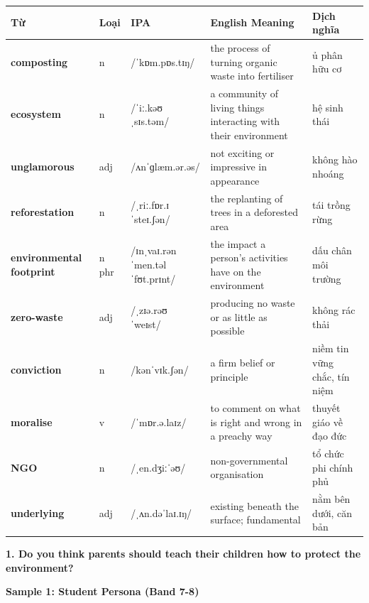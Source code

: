 \vspace{0.8em}
\begin{center}
\renewcommand{\arraystretch}{1.65}
\begin{tabularx}{\textwidth}{|V{0.22\textwidth}|C{0.07\textwidth}|I{0.20\textwidth}|Y|V{0.18\textwidth}|}
\hline
{}
\textbf{Từ} & \textbf{Loại} & \textbf{IPA} & \textbf{English Meaning} & \textbf{Dịch nghĩa} \\
\hline
\textbf{composting} & n & /ˈkɒm.pɒs.tɪŋ/ & the process of turning organic waste into fertiliser & ủ phân hữu cơ \\ \hline
\textbf{ecosystem} & n & /ˈiː.kəʊˌsɪs.təm/ & a community of living things interacting with their environment & hệ sinh thái \\ \hline
\textbf{unglamorous} & adj & /ʌnˈɡlæm.ər.əs/ & not exciting or impressive in appearance & không hào nhoáng \\ \hline
\textbf{reforestation} & n & /ˌriː.fɒr.ɪˈsteɪ.ʃən/ & the replanting of trees in a deforested area & tái trồng rừng \\ \hline
\textbf{environmental footprint} & n phr & /ɪnˌvaɪ.rənˈmen.təl ˈfʊt.prɪnt/ & the impact a person's activities have on the environment & dấu chân môi trường \\ \hline
\textbf{zero-waste} & adj & /ˌzɪə.rəʊ ˈweɪst/ & producing no waste or as little as possible & không rác thải \\ \hline
\textbf{conviction} & n & /kənˈvɪk.ʃən/ & a firm belief or principle & niềm tin vững chắc, tín niệm \\ \hline
\textbf{moralise} & v & /ˈmɒr.ə.laɪz/ & to comment on what is right and wrong in a preachy way & thuyết giáo về đạo đức \\ \hline
\textbf{NGO} & n & /ˌen.dʒiːˈəʊ/ & non-governmental organisation & tổ chức phi chính phủ \\ \hline
\textbf{underlying} & adj & /ˌʌn.dəˈlaɪ.ɪŋ/ & existing beneath the surface; fundamental & nằm bên dưới, căn bản \\ \hline
\end{tabularx}
\end{center}

\partthreeheader

\begin{ieltsquestion}
\textbf{1. Do you think parents should teach their children how to protect the environment?}
\end{ieltsquestion}
\textbf{Sample 1: Student Persona (Band 7-8)}

